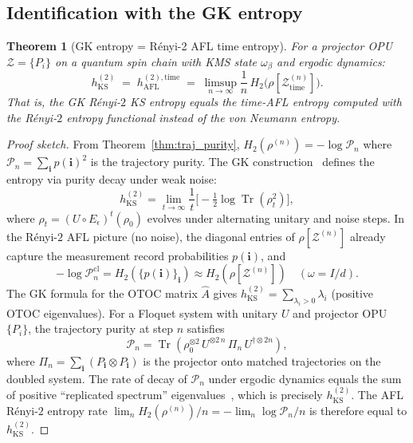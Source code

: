 \documentclass[12pt,a4paper]{article}
\newtheorem{theorem}{Theorem}[section]
\DeclareMathOperator{\Tr}{Tr}
\begin{document}
\subsection{Identification with the GK entropy}

\begin{theorem}[GK entropy = R\'enyi-2 AFL time entropy]
  \label{thm:gk_renyi_afl}
  For a projector OPU $\mathcal{Z}=\{P_i\}$ on a quantum spin chain with KMS
  state $\omega_\beta$ and ergodic dynamics:
  \[
    h_{\mathrm{KS}}^{(2)}
    \;=\; h_{\mathrm{AFL}}^{(2),\mathrm{time}}
    \;=\; \limsup_{n\to\infty}\frac{1}{n}\,H_2\!\bigl(\rho[\mathcal{Z}^{(n)}_{\mathrm{time}}]\bigr).
  \]
  That is, the GK Rényi-$2$ KS entropy equals the time-AFL entropy computed with the
  Rényi-$2$ entropy functional instead of the von Neumann entropy.
\end{theorem}
\begin{proof}[Proof sketch]
  From Theorem~\ref{thm:traj_purity}, $H_2(\rho^{(n)}) = -\log\mathcal{P}_n$ where
  $\mathcal{P}_n = \sum_\mathbf{i} p(\mathbf{i})^2$ is the trajectory purity.
  The GK construction~\cite{gk2021} defines the entropy via purity decay under weak
  noise:
  \[
    h_{\mathrm{KS}}^{(2)}
    = \lim_{t\to\infty} \frac{1}{t}\bigl[-\tfrac{1}{2}\log\Tr(\rho_t^2)\bigr],
  \]
  where $\rho_t = (U\circ E_\epsilon)^t(\rho_0)$ evolves under alternating unitary
  and noise steps.  In the Rényi-$2$ AFL picture (no noise), the diagonal entries of
  $\rho[\mathcal{Z}^{(n)}]$ already capture the measurement record probabilities
  $p(\mathbf{i})$, and
  \[
    -\log\mathcal{P}_n^{\mathrm{cl}}
    = H_2(\{p(\mathbf{i})\}_\mathbf{i})
    \approx H_2(\rho[\mathcal{Z}^{(n)}])
    \quad (\omega=I/d).
  \]
  The GK formula for the OTOC matrix $\hat{A}$ gives
  $h_{\mathrm{KS}}^{(2)} = \sum_{\lambda_i>0}\lambda_i$ (positive OTOC eigenvalues).
  For a Floquet system with unitary $U$ and projector OPU $\{P_i\}$, the
  trajectory purity at step $n$ satisfies
  \[
    \mathcal{P}_n = \Tr(\rho_0^{\otimes 2}\,U^{\otimes 2\,n}\,\Pi_n\,U^{\dagger\otimes 2n}),
  \]
  where $\Pi_n = \sum_\mathbf{i}(P_\mathbf{i}\otimes P_\mathbf{i})$ is the projector
  onto matched trajectories on the doubled system.  The rate of decay of
  $\mathcal{P}_n$ under ergodic dynamics equals the sum of positive
  ``replicated spectrum'' eigenvalues~\cite{gk2021}, which is precisely
  $h_{\mathrm{KS}}^{(2)}$.  The AFL R\'enyi-$2$ entropy rate
  $\lim_n H_2(\rho^{(n)})/n = -\lim_n\log\mathcal{P}_n/n$
  is therefore equal to $h_{\mathrm{KS}}^{(2)}$.
\end{proof}
\end{document}

